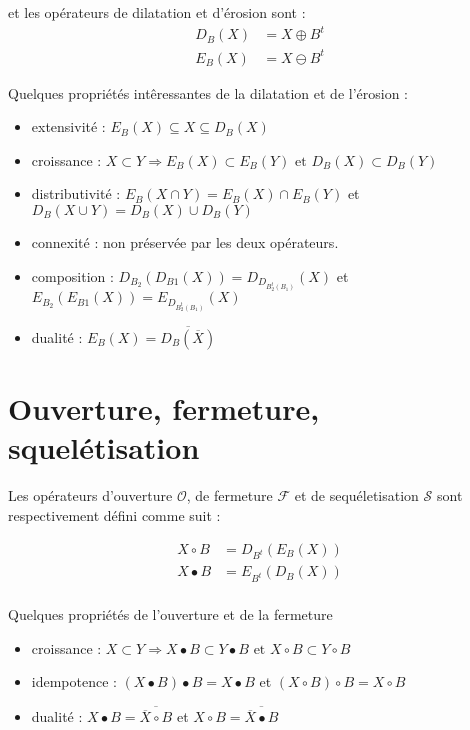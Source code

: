 \documentclass[10pt,a4paper]{article}
\begin{document}
et les op\'{e}rateurs de dilatation et d'\'{e}rosion sont :
\begin{align*}	
	D_{B}\left(X\right) &= X\oplus B^t	\\
	E_{B}\left(X\right) &= X\ominus B^t
\end{align*}


Quelques propri\'{e}t\'{e}s int\^{e}ressantes de la dilatation et de l'\'{e}rosion : 
\begin{itemize}
	\item extensivit\'{e} : $E_B\left(X\right) \subseteq X \subseteq D_B\left(X\right)$ 
	\item croissance : $X\subset Y \Rightarrow E_B\left(X\right) \subset E_B\left(Y\right) \text{ et } D_B\left(X\right) \subset D_B\left(Y\right)$
	\item distributivit\'{e} : $E_B\left(X\cap Y\right) = E_B\left(X\right) \cap E_B\left(Y\right)$ et $D_B\left(X\cup Y\right) = D_B\left(X\right) \cup D_B\left(Y\right)$
	\item connexit\'{e} : non pr\'{e}serv\'{e}e par les deux op\'{e}rateurs.
	\item composition : $D_{B_2}\left(D_{B1}\left(X\right)\right) = D_{D_{B_{2}^{t}\left(B_1\right)}}\left(X\right)$ et  $E_{B_2}\left(E_{B1}\left(X\right)\right) = E_{D_{B_{2}^{t}\left(B_1\right)}}\left(X\right)$ 
	\item dualit\'{e} : $ E_B\left(X\right) = \overline{ D_B\left(\overline{X}\right)}$
\end{itemize}


\section{Ouverture, fermeture, squel\'{e}tisation}

Les op\'{e}rateurs d'ouverture $\mathcal{O}$, de fermeture $\mathcal{F}$ et de sequ\'{e}letisation $\mathcal{S}$ sont respectivement d\'{e}fini comme suit : 

\begin{align*}	
	X\circ B &=  D_{B^t}\left(E_{B}\left(X\right)\right) \\
	X\bullet B &= E_{B^t}\left(D_{B}\left(X\right)\right) \\
\end{align*}


Quelques propri\'{e}t\'{e}s de l'ouverture et de la fermeture
\begin{itemize}
	\item croissance : $X\subset Y \Rightarrow X\bullet B \subset Y\bullet B \text{ et } X\circ B \subset Y\circ B$
	\item idempotence : $\left( X\bullet B \right) \bullet B = X\bullet B $ et $\left( X \circ B \right) \circ B = X\circ B $
	\item dualit\'{e} : $ X\bullet B = \overline{ \overline{X}\circ B}$ et $ X\circ B = \overline{ \overline{X}\bullet B}$
\end{itemize}
\end{document}

